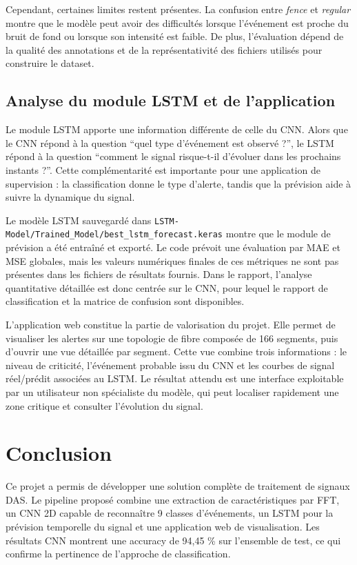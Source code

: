 \documentclass[10pt,a4paper]{article}
\begin{document}
Cependant, certaines limites restent présentes. La confusion entre \textit{fence} et \textit{regular}
montre que le modèle peut avoir des difficultés lorsque l'événement est proche du bruit de fond ou lorsque
son intensité est faible. De plus, l'évaluation dépend de la qualité des annotations et de la représentativité
des fichiers utilisés pour construire le dataset.

\subsection{Analyse du module LSTM et de l'application}

Le module LSTM apporte une information différente de celle du CNN. Alors que le CNN répond à la question
``quel type d'événement est observé ?'', le LSTM répond à la question ``comment le signal risque-t-il
d'évoluer dans les prochains instants ?''. Cette complémentarité est importante pour une application de
supervision : la classification donne le type d'alerte, tandis que la prévision aide à suivre la dynamique du
signal.

Le modèle LSTM sauvegardé dans \texttt{LSTM-Model/Trained\_Model/best\_lstm\_forecast.keras} montre que le
module de prévision a été entraîné et exporté. Le code prévoit une évaluation par MAE et MSE globales, mais
les valeurs numériques finales de ces métriques ne sont pas présentes dans les fichiers de résultats fournis.
Dans le rapport, l'analyse quantitative détaillée est donc centrée sur le CNN, pour lequel le rapport de
classification et la matrice de confusion sont disponibles.

L'application web constitue la partie de valorisation du projet. Elle permet de visualiser les alertes sur
une topologie de fibre composée de 166 segments, puis d'ouvrir une vue détaillée par segment. Cette vue
combine trois informations : le niveau de criticité, l'événement probable issu du CNN et les courbes de
signal réel/prédit associées au LSTM. Le résultat attendu est une interface exploitable par un utilisateur
non spécialiste du modèle, qui peut localiser rapidement une zone critique et consulter l'évolution du
signal.

\section{Conclusion}

Ce projet a permis de développer une solution complète de traitement de signaux DAS. Le pipeline proposé
combine une extraction de caractéristiques par FFT, un CNN 2D capable de reconnaître 9 classes d'événements,
un LSTM pour la prévision temporelle du signal et une application web de visualisation. Les résultats CNN
montrent une accuracy de 94,45 \% sur l'ensemble de test, ce qui confirme la pertinence de l'approche de
classification.
\end{document}
